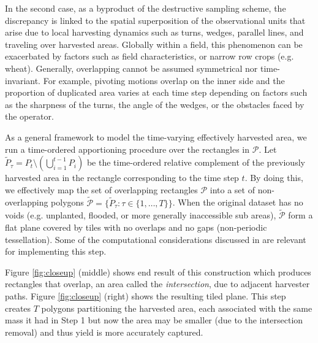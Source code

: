 In the second case, as a byproduct
of the destructive sampling scheme, the discrepancy is linked to the
spatial superposition of the observational units that arise due to
local harvesting dynamics such as turns, wedges, parallel lines, and
traveling over harvested areas. Globally within a field, this
phenomenon can be exacerbated by factors such as field
characteristics, or narrow row crops (e.g. wheat). Generally,
overlapping cannot be assumed symmetrical nor time-invariant. For
example, pivoting motions overlap on the inner side and the proportion
of duplicated area varies at each time step depending on factors such
as the sharpness of the turns, the angle of the wedges, or the
obstacles faced by the operator.

 As a general framework to model the
time-varying effectively harvested area, we run a time-ordered
apportioning procedure over the rectangles in $\mathcal{P}$. Let
$\tilde{P}_\tau = P_t \setminus \left( \bigcup_{i = 1}^{t - 1}
P_i \right)$ be the time-ordered relative complement of the previously
harvested area in the rectangle corresponding to the time step $t$. By
doing this, we effectively map the set of overlapping rectangles
$\mathcal{P}$ into a set of non-overlapping polygons
$\tilde{\mathcal{P}} = \{\tilde{P}_{\tau}: \tau \in \{1, \dots, T
\}\}$. When the original dataset has no voids (e.g. unplanted, flooded,
or more generally inaccessible sub areas), $\tilde{\mathcal{P}}$ form
a flat plane covered by tiles with no overlaps and no gaps
(non-periodic tessellation). Some of the computational considerations
discussed in \cite{Drummond1999} are relevant for implementing this
step.

Figure \ref{fig:closeup} (middle) shows end result of this
construction which produces rectangles that overlap, an area called
the \emph{intersection}, due to adjacent harvester paths. Figure
\ref{fig:closeup} (right) shows the resulting tiled plane. This step
creates $T$ polygons partitioning the harvested area, each associated
with the same mass it had in Step 1 but now the area may be smaller
(due to the intersection removal) and thus yield is more accurately
captured.

